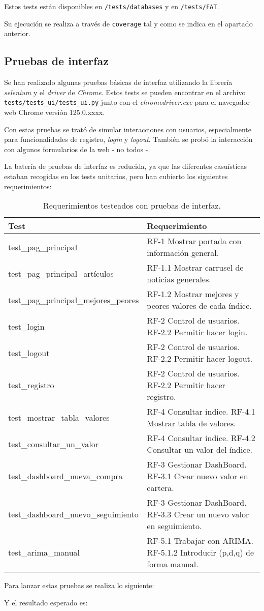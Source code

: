 Estos tests están disponibles en \texttt{/tests/databases} y en \texttt{/tests/FAT}.  

Su ejecución se realiza a través de \texttt{coverage} tal y como se indica en el apartado anterior. 


\subsection{Pruebas de interfaz}

Se han realizado algunas pruebas básicas de interfaz utilizando la librería \emph{selenium}\citep{online:selenium} y el \emph{driver} de \emph{Chrome}. Estos tests se pueden encontrar en el archivo \texttt{tests/tests\_ui/tests\_ui.py} junto con el \emph{chromedriver.exe}\citep{online:chrome_driver} para el navegador web Chrome versión 125.0.xxxx. 

Con estas pruebas se trató de simular interacciones con usuarios, especialmente para funcionalidades de registro, \emph{login} y \emph{logout}. También se probó la interacción con algunos formularios de la web - no todos -. 

La batería de pruebas de interfaz es reducida, ya que las diferentes casuísticas estaban recogidas en los tests unitarios, pero han cubierto los siguientes requerimientos:


\begin{table}[H]
\centering
\begin{tabularx}{\textwidth}{>{\ttfamily}lX}
\toprule
\textnormal{Test} & Requerimiento \\
\midrule
test\_pag\_principal & RF-1 Mostrar portada con información general. \\
test\_pag\_principal\_artículos & RF-1.1 Mostrar carrusel de noticias generales. \\
test\_pag\_principal\_mejores\_peores & RF-1.2 Mostrar mejores y peores valores de cada índice. \\
test\_login & RF-2 Control de usuarios. RF-2.2 Permitir hacer login. \\
test\_logout & RF-2 Control de usuarios. RF-2.2 Permitir hacer logout. \\
test\_registro & RF-2 Control de usuarios. RF-2.2 Permitir hacer registro. \\
test\_mostrar\_tabla\_valores & RF-4 Consultar índice. RF-4.1 Mostrar tabla de valores. \\
test\_consultar\_un\_valor & RF-4 Consultar índice. RF-4.2 Consultar un valor del índice. \\
test\_dashboard\_nueva\_compra & RF-3 Gestionar DashBoard. RF-3.1 Crear nuevo valor en cartera. \\
test\_dashboard\_nuevo\_seguimiento & RF-3 Gestionar DashBoard. RF-3.3 Crear un nuevo valor en seguimiento. \\
test\_arima\_manual & RF-5.1 Trabajar con ARIMA. RF-5.1.2 Introducir (p,d,q) de forma manual. \\
\bottomrule
\end{tabularx}
\caption{Requerimientos testeados con pruebas de interfaz.}
\label{requisitos-test}
\end{table}

\newpage
Para lanzar estas pruebas se realiza lo siguiente:


Y el resultado esperado es:

